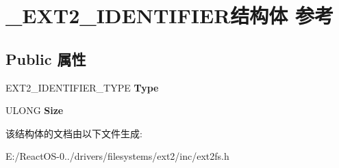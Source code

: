 \hypertarget{struct___e_x_t2___i_d_e_n_t_i_f_i_e_r}{}\section{\+\_\+\+E\+X\+T2\+\_\+\+I\+D\+E\+N\+T\+I\+F\+I\+E\+R结构体 参考}
\label{struct___e_x_t2___i_d_e_n_t_i_f_i_e_r}
\subsection*{Public 属性}
\begin{DoxyCompactItemize}
\item 
\mbox{\label{struct___e_x_t2___i_d_e_n_t_i_f_i_e_r_ae3bbf7a8c1f1fc7883fa59d4f5a03eab}} 
E\+X\+T2\+\_\+\+I\+D\+E\+N\+T\+I\+F\+I\+E\+R\+\_\+\+T\+Y\+PE {\bfseries Type}
\item 
\mbox{\label{struct___e_x_t2___i_d_e_n_t_i_f_i_e_r_ab5769586d267484e8cb8d205dc9b5de3}} 
U\+L\+O\+NG {\bfseries Size}
\end{DoxyCompactItemize}


该结构体的文档由以下文件生成\+:\begin{DoxyCompactItemize}
\item 
E\+:/\+React\+O\+S-\/0../drivers/filesystems/ext2/inc/ext2fs.\+h\end{DoxyCompactItemize}
